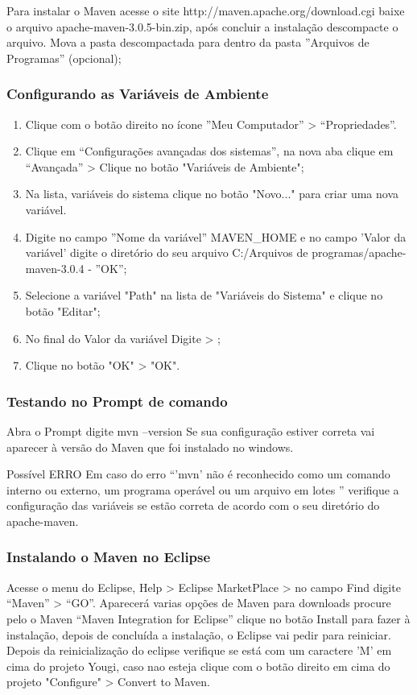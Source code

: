 \documentclass[envcountsame,envcountchap,letterpaper]{svmono}
\begin{document}
Para instalar o Maven acesse o site http://maven.apache.org/download.cgi baixe o arquivo apache-maven-3.0.5-bin.zip, após concluir a instalação descompacte o arquivo. Mova a pasta descompactada para dentro da pasta ''Arquivos de Programas'' (opcional);

\subsubsection{Configurando as Variáveis de Ambiente}

\begin{enumerate}
\item Clique com o botão direito no ícone ''Meu Computador” > “Propriedades”.
\item Clique em “Configurações avançadas dos sistemas”, na nova aba clique em “Avançada” > Clique no botão  "Variáveis de Ambiente";
\item Na lista, variáveis do sistema clique no botão "Novo..." para criar uma nova variável.
\item Digite no campo ''Nome da variável'' MAVEN\_HOME e no campo 'Valor da variável' digite o diretório do seu arquivo C:/Arquivos de programas/apache-maven-3.0.4 - ''OK'';
\item Selecione a variável "Path" na lista de "Variáveis do Sistema" e clique no botão "Editar";
\item No final do Valor da variável Digite > ;%
\item Clique no botão "OK" > "OK".
\end{enumerate}

\subsubsection{Testando no Prompt de comando}

Abra o Prompt digite mvn –version
Se sua configuração estiver correta vai aparecer à versão do Maven que foi instalado no windows.
 
 	Possível ERRO
Em caso do erro “'mvn' não é reconhecido como um comando interno ou externo, um programa operável ou um arquivo em lotes ” verifique a configuração das variáveis se estão correta de acordo com o seu diretório do apache-maven.

\subsubsection{Instalando o Maven no Eclipse}
	Acesse o menu do Eclipse, Help > Eclipse MarketPlace > no campo Find digite “Maven” > “GO”. Aparecerá varias opções de Maven para downloads procure pelo o Maven “Maven Integration for Eclipse” clique no botão Install para fazer à instalação, depois de concluída a instalação, o Eclipse vai pedir para reiniciar.
	Depois da reinicialização do eclipse verifique se está com um caractere 'M' em cima do projeto Yougi, caso nao esteja clique com o botão direito em cima do projeto "Configure" > Convert to Maven.
\end{document}
